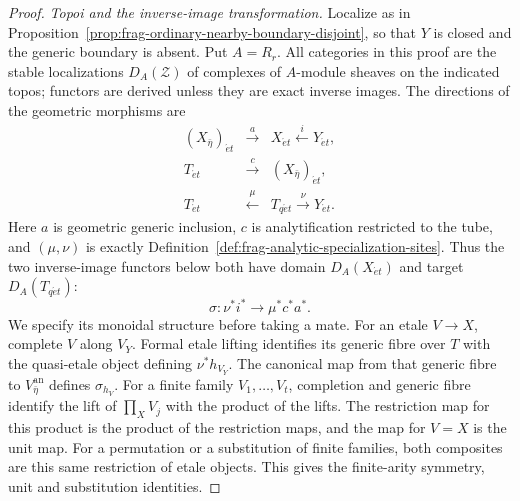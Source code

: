 \documentclass[11pt]{article}
\theoremstyle{definition}
\theoremstyle{remark}
\begin{document}
\begin{proof}
\emph{Topoi and the inverse-image transformation.}
Localize as in Proposition~\ref{prop:frag-ordinary-nearby-boundary-disjoint},
so that $Y$ is closed and the generic boundary is absent.  Put $A=R_r$.
All categories in this proof are the stable localizations
$D_A(\mathcal Z)$ of complexes of $A$-module sheaves on the indicated
topos; functors are derived unless they are exact inverse images.
The directions of the geometric morphisms are
\[
\begin{array}{ccc}
 (X_{\bar\eta})_{\acute et}&\xrightarrow{a}&X_{\acute et}
                           \xleftarrow{i}Y_{\acute et},\\
 T_{\acute et}&\xrightarrow{c}&(X_{\bar\eta})_{\acute et},\\
 T_{\acute et}&\xleftarrow{\mu}&T_{q\acute et}
                           \xrightarrow{\nu}Y_{\acute et}.
\end{array}
\]
Here $a$ is geometric generic inclusion, $c$ is analytification
restricted to the tube, and $(\mu,\nu)$ is exactly
Definition~\ref{def:frag-analytic-specialization-sites}.
Thus the two inverse-image functors below both have domain
$D_A(X_{\acute et})$ and target $D_A(T_{q\acute et})$:
\[
 \sigma:\nu^*i^*\longrightarrow\mu^*c^*a^*.
\]
We specify its monoidal structure before taking a mate.
For an etale $V\to X$, complete $V$ along $V_Y$.  Formal etale
lifting identifies its generic fibre over $T$ with the quasi-etale
object defining $\nu^*h_{V_Y}$.  The canonical map from that generic
fibre to $V_{\bar\eta}^{\mathrm{an}}$ defines $\sigma_{h_V}$.
For a finite family $V_1,\ldots,V_t$, completion and generic fibre
identify the lift of $\prod_XV_j$ with the product of the lifts.
The restriction map for this product is the product of the
restriction maps, and the map for $V=X$ is the unit map.
For a permutation or a substitution of finite families, both
composites are this same restriction of etale objects.  This gives
the finite-arity symmetry, unit and substitution identities.


\end{proof}
\end{document}
